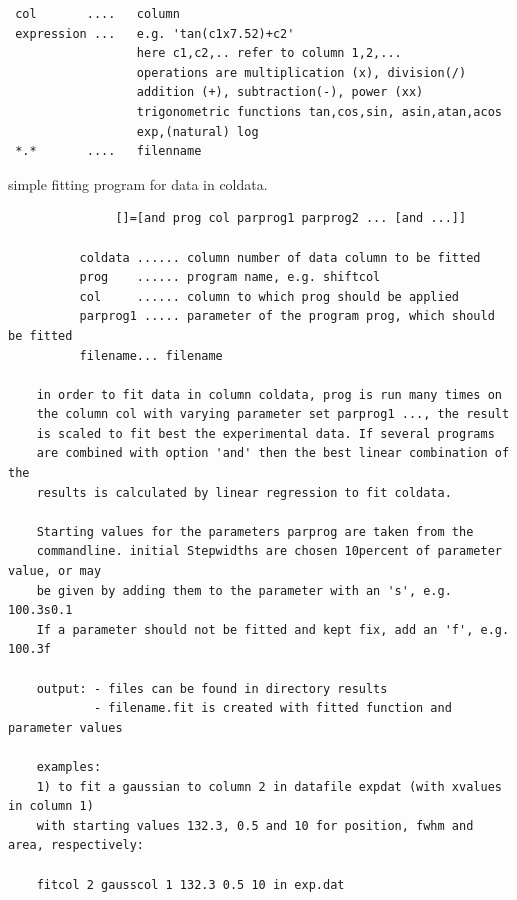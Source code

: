 \begin{description}
\begin{verbatim}
 col       ....   column
 expression ...   e.g. 'tan(c1x7.52)+c2'
                  here c1,c2,.. refer to column 1,2,...
                  operations are multiplication (x), division(/)
                  addition (+), subtraction(-), power (xx)
                  trigonometric functions tan,cos,sin, asin,atan,acos
                  exp,(natural) log
 *.*       ....   filenname
\end{verbatim}
\item [\prg fitcol coldata prog col parprog1 parprog2 ... {[]} in filename:\index{fitcol}\label{fitcol}]
simple fitting program for data in coldata.
\begin{verbatim}
               []=[and prog col parprog1 parprog2 ... [and ...]]

          coldata ...... column number of data column to be fitted
          prog    ...... program name, e.g. shiftcol
          col     ...... column to which prog should be applied
          parprog1 ..... parameter of the program prog, which should be fitted
          filename... filename

    in order to fit data in column coldata, prog is run many times on
    the column col with varying parameter set parprog1 ..., the result
    is scaled to fit best the experimental data. If several programs
    are combined with option 'and' then the best linear combination of the
    results is calculated by linear regression to fit coldata.

    Starting values for the parameters parprog are taken from the
    commandline. initial Stepwidths are chosen 10percent of parameter value, or may
    be given by adding them to the parameter with an 's', e.g. 100.3s0.1
    If a parameter should not be fitted and kept fix, add an 'f', e.g. 100.3f

    output: - files can be found in directory results
            - filename.fit is created with fitted function and parameter values

    examples:
    1) to fit a gaussian to column 2 in datafile expdat (with xvalues in column 1)
    with starting values 132.3, 0.5 and 10 for position, fwhm and area, respectively:

    fitcol 2 gausscol 1 132.3 0.5 10 in exp.dat



\end{verbatim}
\end{description}
